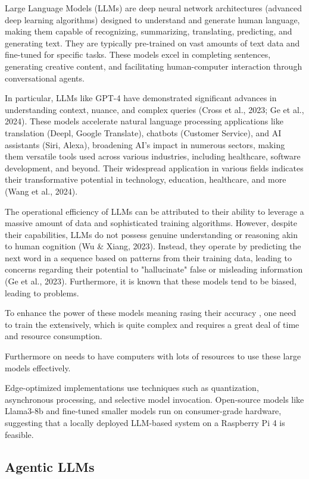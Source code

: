 Large Language Models (LLMs) are deep neural network architectures (advanced deep learning algorithms) designed to understand and generate human language, making them capable of recognizing, summarizing, translating, predicting, and generating text. They are typically pre-trained on vast amounts of text data and fine-tuned for specific tasks. These models excel in completing sentences, generating creative content, and facilitating human-computer interaction through conversational agents.

In particular, LLMs like GPT-4 have demonstrated significant advances in understanding context, nuance, and complex queries (Cross et al., 2023; Ge et al., 2024). These models accelerate natural language processing applications like translation (Deepl, Google Translate), chatbots (Customer Service), and AI assistants (Siri, Alexa), broadening AI's impact in numerous sectors, making them versatile tools used across various industries, including healthcare, software development, and beyond. Their widespread application in various fields indicates their transformative potential in technology, education, healthcare, and more (Wang et al., 2024).

The operational efficiency of LLMs can be attributed to their ability to leverage a massive amount of data and sophisticated training algorithms. However, despite their capabilities, LLMs do not possess genuine understanding or reasoning akin to human cognition (Wu & Xiang, 2023). Instead, they operate by predicting the next word in a sequence based on patterns from their training data, leading to concerns regarding their potential to "hallucinate" false or misleading information (Ge et al., 2023). Furthermore, it is known that these models tend to be biased, leading to problems.

To enhance the power of these models meaning rasing their accuracy , one need to train the extensively, which is quite complex and requires a great deal of time and resource consumption.   

Furthermore on needs to have computers with lots of resources to use these large models effectively.

Edge-optimized implementations use techniques such as quantization, asynchronous processing, and selective
model invocation. Open-source models like Llama3-8b and fine-tuned smaller models run on consumer-grade
hardware, suggesting that a locally deployed LLM-based system on a Raspberry Pi 4 is feasible. 

\subsection{Agentic LLMs}
\label{subsec:background:second_section:second_subsection}

